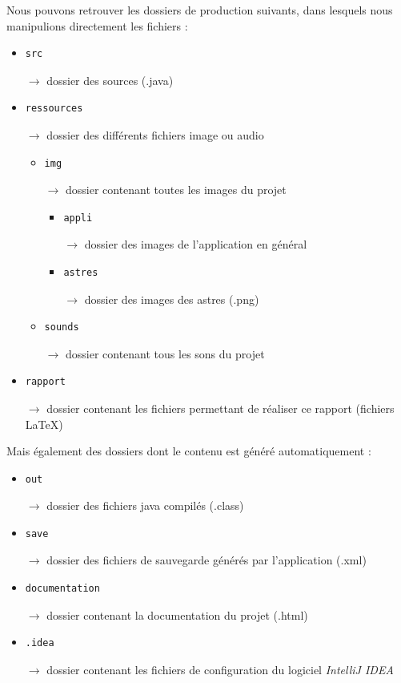 \documentclass[a4paper,10pt]{article}
\begin{document}
Nous pouvons retrouver les dossiers de production suivants, dans lesquels nous manipulions directement les fichiers :
\begin{itemize}
 \item \begin{verbatim}src\end{verbatim} $\rightarrow$ dossier des sources (.java)
 \item \begin{verbatim}ressources\end{verbatim} $\rightarrow$ dossier des différents fichiers image ou audio
 \begin{itemize}
  \item \begin{verbatim}img\end{verbatim} $\rightarrow$ dossier contenant toutes les images du projet
  \begin{itemize}
   \item \begin{verbatim}appli\end{verbatim} $\rightarrow$ dossier des images de l'application en général
   \item \begin{verbatim}astres\end{verbatim} $\rightarrow$ dossier des images des astres (.png)
  \end{itemize}
  \item \begin{verbatim}sounds\end{verbatim} $\rightarrow$ dossier contenant tous les sons du projet
 \end{itemize}
 \item \begin{verbatim}rapport\end{verbatim} $\rightarrow$ dossier contenant les fichiers permettant de réaliser ce rapport (fichiers \LaTeX)
\end{itemize}
\vspace{0.5cm}
Mais également des dossiers dont le contenu est généré automatiquement :
\begin{itemize}
 \item \begin{verbatim}out\end{verbatim} $\rightarrow$ dossier des fichiers java compilés (.class)
 \item \begin{verbatim}save\end{verbatim} $\rightarrow$ dossier des fichiers de sauvegarde générés par l'application (.xml)
 \item \begin{verbatim}documentation\end{verbatim} $\rightarrow$ dossier contenant la documentation du projet (.html)
 \item \begin{verbatim}.idea\end{verbatim} $\rightarrow$ dossier contenant les fichiers de configuration du logiciel \textit{IntelliJ IDEA}
\end{itemize}
\end{document}
